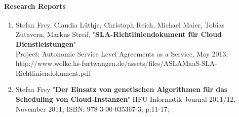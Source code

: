 \paragraph{Research Reports}

\begin{enumerate}
	\item Stefan Frey, Claudia L\"uthje, Christoph Reich, Michael Maier, Tobias Zutavern, Markus Streif,  "\textbf{SLA-Richtliniendokument f\"ur Cloud Dienstleistungen}" \\ Project: Autonomic Service Level Agreements as a Service, May 2013,\\ http://www.wolke.hs-furtwangen.de/assets/files/ASLAMaaS-SLA-Richtliniendokument.pdf
	
	\item Stefan Frey "\textbf{Der Einsatz von genetischen Algorithmen f\"ur das Scheduling von Cloud-Instanzen}" HFU Informatik Journal 2011/12, November 2011; ISBN: 978-3-00-035367-3; p:11-17; 
\end{enumerate}








\